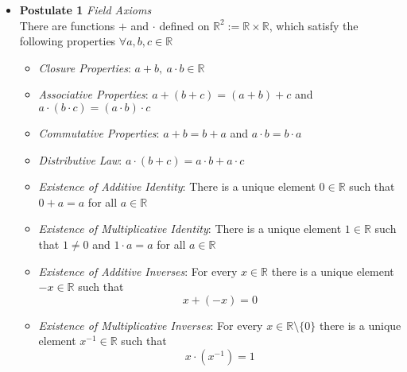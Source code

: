 \documentclass[11pt,a4paper]{article}
\begin{document}
\begin{itemize}
    \item \textbf{Postulate 1} \emph{Field Axioms} \\
        There are functions $+$ and $\cdot$ defined on
        $\mathbb{R}^2 := \mathbb{R} \times \mathbb{R}$,
        which satisfy the following properties $\forall a, b, c \in \mathbb{R}$

        \begin{itemize}
            \item \emph{Closure Properties}:
                $a + b, \ a \cdot b \in \mathbb{R}$
            \item \emph{Associative Properties}:
                $a + (b + c) = (a + b) + c$ and
                $a \cdot (b \cdot c) = (a \cdot b) \cdot c$
            \item \emph{Commutative Properties}:
                $a + b = b + a$ and $a \cdot b = b \cdot a$
            \item \emph{Distributive Law}:
                $a \cdot (b + c) = a \cdot b + a \cdot c$
            \item \emph{Existence of Additive Identity}:
                There is a unique element $0 \in \mathbb{R}$ such that
                $0 + a = a$ for all $a \in \mathbb{R}$
            \item \emph{Existence of Multiplicative Identity}:
                There is a unique element $1 \in \mathbb{R}$ such that
                $1 \neq 0$ and $1 \cdot a = a$ for all $a \in \mathbb{R}$
            \item \emph{Existence of Additive Inverses}:
                For every $x \in \mathbb{R}$ there is a unique element $-x \in \mathbb{R}$
                such that
                \[
                    x + (-x) = 0
                \]
            \item \emph{Existence of Multiplicative Inverses}:
                For every $x \in \mathbb{R} \setminus \{0\}$ there is a unique element
                $x^{-1} \in \mathbb{R}$ such that
                \[
                    x \cdot (x^{-1}) = 1
                \]
        \end{itemize}


\end{itemize}
\end{document}
